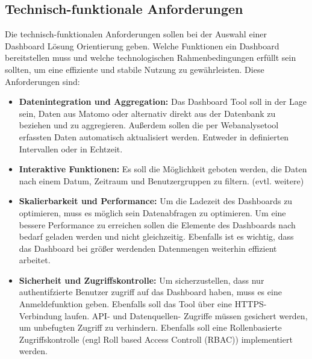 \subsection{Technisch-funktionale Anforderungen}
Die technisch-funktionalen Anforderungen sollen bei der Auswahl einer Dashboard Lösung Orientierung geben. Welche Funktionen ein Dashboard bereitstellen muss und welche technologischen Rahmenbedingungen erfüllt sein sollten, um eine effiziente und stabile Nutzung zu gewährleisten. Diese Anforderungen sind: 
\begin{itemize}
    \item \textbf{Datenintegration und Aggregation:} Das Dashboard Tool soll in der Lage sein, Daten aus Matomo oder alternativ direkt aus der Datenbank zu beziehen und zu aggregieren. Außerdem sollen die per Webanalysetool erfassten Daten automatisch aktualisiert werden. Entweder in definierten Intervallen oder in Echtzeit.
    \item \textbf{Interaktive Funktionen:} Es soll die Möglichkeit geboten werden, die Daten nach einem Datum, Zeitraum und Benutzergruppen zu filtern. (evtl. weitere)
    \item \textbf{Skalierbarkeit und Performance:} Um die Ladezeit des Dashboards zu optimieren, muss es möglich sein Datenabfragen zu optimieren. Um eine bessere Performance zu erreichen sollen die Elemente des Dashboards nach bedarf geladen werden und nicht gleichzeitig. Ebenfalls ist es wichtig, dass das Dashboard bei größer werdenden Datenmengen weiterhin effizient arbeitet.
    \item \textbf{Sicherheit und Zugriffskontrolle:} Um sicherzustellen, dass nur authentifzierte Benutzer zugriff auf das Dashboard haben, muss es eine Anmeldefunktion geben. Ebenfalls soll das Tool über eine HTTPS-Verbindung laufen. API- und Datenquellen- Zugriffe müssen gesichert werden, um unbefugten Zugriff zu verhindern. Ebenfalls soll eine Rollenbasierte Zugriffskontrolle (engl Roll based Access Controll (RBAC)) implementiert werden.
\end{itemize}

